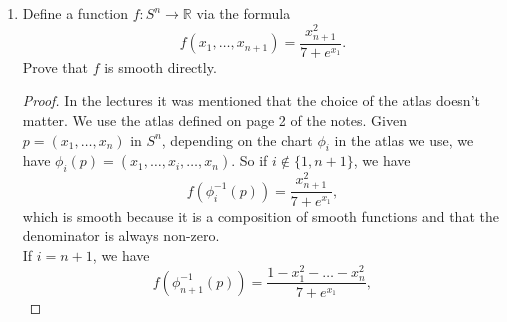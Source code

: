 \documentclass{article}
\begin{document}
\begin{enumerate}[label={\bf Q\arabic*:}]
  \item Define a function $f:S^n\rightarrow\mathbb{R}$ via the formula
    \begin{equation*}
      f(x_1,\ldots,x_{n+1}) = \frac{x_{n+1}^2}{7+e^{x_1}}.
    \end{equation*}
    Prove that $f$ is smooth directly.

    \begin{proof}
      In the lectures it was mentioned that the choice of the atlas doesn't
      matter. We use the atlas defined on page 2 of the notes. Given
      $p=(x_1,\ldots,x_n)$ in $S^n$, depending on the chart $\phi_i$ in the
      atlas we use, we have $\phi_i(p)=(x_1,\ldots,\hat{x_i},\ldots,x_n)$.
      So if $i\not\in\{1,n+1\}$, we have
      \begin{equation*}
        f(\phi_i^{-1}(p)) = \frac{x_{n+1}^2}{7+e^{x_1}},
      \end{equation*}
      which is smooth because it is a composition of smooth functions and
      that the denominator is always non-zero. \\

      If $i=n+1$, we have
      \begin{equation*}
        f(\phi_{n+1}^{-1}(p)) = \frac{1-x_1^2-\ldots-x_n^2}{7+e^{x_1}},
      \end{equation*}
    \end{proof}
\end{enumerate}
\end{document}

